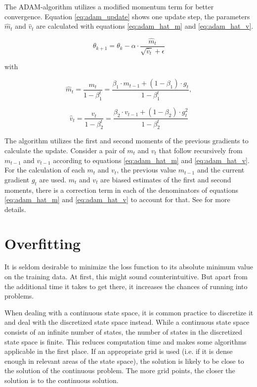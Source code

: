 The ADAM-algorithm utilizes a modified momentum term for better convergence. Equation \ref{eq:adam_update} shows one update step, the parameters $\hat m_t$ and $\hat v_t$ are calculated with equations \ref{eq:adam_hat_m} and \ref{eq:adam_hat_v}.

\begin{equation}
\theta_{k+1}=\theta_k-\alpha\cdot\frac{\hat{m}_t}{\sqrt{\hat v_t}+\epsilon}
\label{eq:adam_update}
\end{equation}

with

\begin{equation}
\hat{m}_t= \frac{m_t}{1-\beta_1^t}= \frac{\beta_1\cdot m_{t-1}+(1-\beta_1)\cdot g_t}{1-\beta_1^t},
\label{eq:adam_hat_m}
\end{equation}


\begin{equation}
\hat v_t= \frac{v_t}{1-\beta_2^t}= \frac{\beta_2\cdot v_{t-1}+(1-\beta_2)\cdot g_t^2}{1-\beta_2^t}
\label{eq:adam_hat_v}
\end{equation}

The algorithm utilizes the first and second moments of the previous gradients to calculate the update. Consider a pair of $m_t$ and $v_t$ that follow recursively from $m_{t-1}$ and $v_{t-1}$ according to equations \ref{eq:adam_hat_m} and \ref{eq:adam_hat_v}. For the calculation of each $m_t$ and $v_t$, the previous value $m_{t-1}$ and the current gradient $g_t$ are used. $m_t$ and $v_t$ are biased estimates of the first and second moments, there is a correction term in each of the denominators of equations \ref{eq:adam_hat_m} and \ref{eq:adam_hat_v} to account for that. See \cite{DBLP:journals/corr/KingmaB14} for more details.

\section{Overfitting}

It is seldom desirable to minimize the loss function to its absolute minimum value on the training data. At first, this might sound counterintuitive. But apart from the additional time it takes to get there, it increases the chances of running into problems.

When dealing with a continuous state space, it is common practice to discretize it and deal with the discretized state space instead. While a continuous state space consists of an infinite number of states, the number of states in the discretized state space is finite. This reduces computation time and makes some algorithms applicable in the first place. If an appropriate grid is used (i.e. if it is dense enough in relevant areas of the state space), the solution is likely to be close to the solution of the continuous problem. The more grid points, the closer the solution is to the continuous solution.

